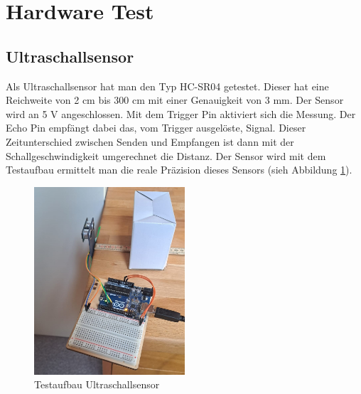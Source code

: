 \newpage
\section{Hardware Test}

\subsection{Ultraschallsensor}
Als Ultraschallsensor hat man den Typ HC-SR04 getestet. Dieser hat eine Reichweite von 2 cm bis 300 cm mit einer Genauigkeit von 3 mm. Der Sensor wird an 5 V angeschlossen. Mit dem Trigger Pin aktiviert sich die Messung. Der Echo Pin empfängt dabei das, vom Trigger ausgelöste, Signal. Dieser Zeitunterschied zwischen Senden und Empfangen ist dann mit der Schallgeschwindigkeit umgerechnet die Distanz. Der Sensor wird mit dem Testaufbau ermittelt man die reale Präzision dieses Sensors (sieh Abbildung \ref{fig:Ultraschall1}).

\begin{figure}[h] %
    \centering
    \includegraphics[width=0.5\textwidth]{img/sensortest/Ultraschall_Senkrecht.jpg} %
    \caption{Testaufbau Ultraschallsensor}
    \label{fig:Ultraschall1} %
\end{figure}


